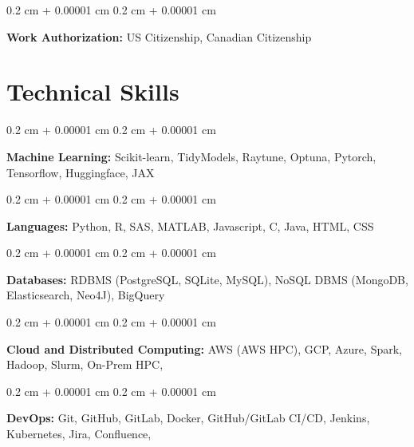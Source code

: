 \documentclass[10pt, letterpaper]{article}
\newenvironment{onecolentry}{
    \begin{adjustwidth}{
        0.2 cm + 0.00001 cm
    }{
        0.2 cm + 0.00001 cm
    }
}{
    \end{adjustwidth}
} %
\begin{document}
        \vspace{0.2 cm}

        \begin{onecolentry}
            \textbf{Work Authorization:} US Citizenship, Canadian Citizenship
        \end{onecolentry}


    
    \section{Technical Skills}



        
        \begin{onecolentry}
            \textbf{Machine Learning:} Scikit-learn, TidyModels, Raytune, Optuna, Pytorch, Tensorflow, Huggingface, JAX
        \end{onecolentry}

        \vspace{0.2 cm}

        \begin{onecolentry}
            \textbf{Languages:} Python, R, SAS, MATLAB, Javascript, C, Java, HTML, CSS
        \end{onecolentry}

        \vspace{0.2 cm}

        \begin{onecolentry}
            \textbf{Databases:} RDBMS (PostgreSQL, SQLite, MySQL), NoSQL DBMS (MongoDB, Elasticsearch, Neo4J), BigQuery
        \end{onecolentry}

        \vspace{0.2 cm}

        \begin{onecolentry}
            \textbf{Cloud and Distributed Computing:} AWS (AWS HPC), GCP, Azure, Spark, Hadoop, Slurm, On-Prem HPC,
        \end{onecolentry}

        \vspace{0.2 cm}

        \begin{onecolentry}
            \textbf{DevOps:} Git, GitHub, GitLab, Docker, GitHub/GitLab CI/CD, Jenkins, Kubernetes, Jira, Confluence,
        \end{onecolentry}

        \vspace{0.2 cm}
\end{document}
